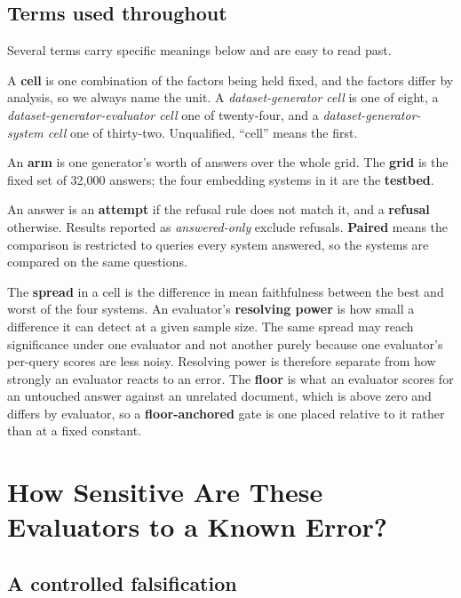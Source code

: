 \documentclass[11pt]{article}
\begin{document}
\subsection{Terms used throughout}
\label{sec:terms}

Several terms carry specific meanings below and are easy to read past.

A \textbf{cell} is one combination of the factors being held fixed, and the factors differ by analysis, so we always name the unit. A \emph{dataset-generator cell} is one of eight, a \emph{dataset-generator-evaluator cell} one of twenty-four, and a \emph{dataset-generator-system cell} one of thirty-two. Unqualified, ``cell'' means the first.

An \textbf{arm} is one generator's worth of answers over the whole grid. The \textbf{grid} is the fixed set of 32,000 answers; the four embedding systems in it are the \textbf{testbed}.

An answer is an \textbf{attempt} if the refusal rule does not match it, and a \textbf{refusal} otherwise. Results reported as \emph{answered-only} exclude refusals. \textbf{Paired} means the comparison is restricted to queries every system answered, so the systems are compared on the same questions.

The \textbf{spread} in a cell is the difference in mean faithfulness between the best and worst of the four systems. An evaluator's \textbf{resolving power} is how small a difference it can detect at a given sample size. The same spread may reach significance under one evaluator and not another purely because one evaluator's per-query scores are less noisy. Resolving power is therefore separate from how strongly an evaluator reacts to an error. The \textbf{floor} is what an evaluator scores for an untouched answer against an unrelated document, which is above zero and differs by evaluator, so a \textbf{floor-anchored} gate is one placed relative to it rather than at a fixed constant.


\section{How Sensitive Are These Evaluators to a Known Error?}
\label{sec:sensitivity}


\subsection{A controlled falsification}
\label{sec:falsification}
\end{document}
